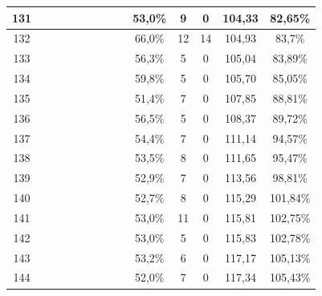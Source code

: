 \begin{longtable}{|c|c|c|c|c|c|c|c|c|c|c|c|c|c|}
131 &  \x    & \x    &       & \x    &       & \x\m  &       &       & 53,0\% &  9  & 0  & 104,33 & 82,65\% \\ \hline
132 &  \x    & \x    &       &       & \x\m  &       & \x\m  &       & 66,0\% &  12 & 14 & 104,93 & 83,7\% \\ \hline
133 &  \x    & \x    &       & \x    & \x    &       &       & \x    & 56,3\% &  5  & 0  & 105,04 & 83,89\% \\ \hline
134 &  \x    & \x    & \x    &       &       & \x\m  & \x\m  &       & 59,8\% &  5  & 0  & 105,70 & 85,05\% \\ \hline
135 &  \x    & \x    &       &       &       & \x\m  &       & \x\m  & 51,4\% &  7  & 0  & 107,85 & 88,81\% \\ \hline
136 &  \x    & \x    &       & \x    & \x    &       & \x    &       & 56,5\% &  5  & 0  & 108,37 & 89,72\% \\ \hline
137 &  \x    & \x    &       & \x    &       &       & \x    &       & 54,4\% &  7  & 0  & 111,14 & 94,57\% \\ \hline
138 &  \x    & \x    &       & \x    &       &       & \x\m  &       & 53,5\% &  8  & 0  & 111,65 & 95,47\% \\ \hline
139 &  \x    & \x    &       & \x    &       & \x\m  & \x\m  &       & 52,9\% &  7  & 0  & 113,56 & 98,81\% \\ \hline
140 &  \x    & \x    &       & \x    &       &       &       & \x    & 52,7\% &  8  & 0  & 115,29 & 101,84\% \\ \hline
141 &  \x    & \x    &       &       &       &       & \x\m  &       & 53,0\% &  11 & 0  & 115,81 & 102,75\% \\ \hline
142 &  \x    & \x    &       & \x    &       & \x\m  &       & \x\m  & 53,0\% &  5  & 0  & 115,83 & 102,78\% \\ \hline
143 &  \x    & \x    &       & \x    &       & \x    & \x    &       & 53,2\% &  6  & 0  & 117,17 & 105,13\% \\ \hline
144 &  \x    & \x    &       &       &       & \x\m  & \x\m  &       & 52,0\% &  7  & 0  & 117,34 & 105,43\% \\ \hline
\end{longtable}
\normalsize

